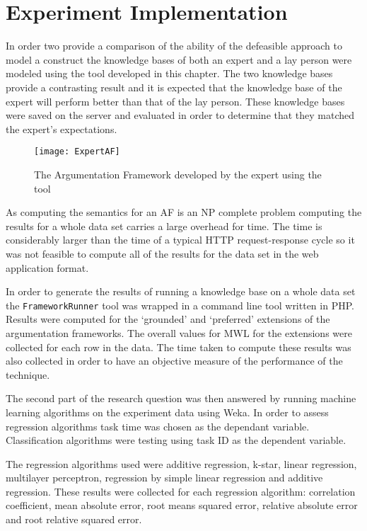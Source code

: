 
\section{Experiment Implementation}

In order two provide a comparison of the ability of the defeasible approach to model a construct the knowledge bases of both an expert and a lay person were modeled using the tool developed in this chapter. The two knowledge bases provide a contrasting result and it is expected that the knowledge base of the expert will perform better than that of the lay person. These knowledge bases were saved on the server and evaluated in order to determine that they matched the expert's expectations.

\begin{figure}[H]
\centering
\texttt{[image: ExpertAF]}
\caption{The Argumentation Framework developed by the expert using the tool}
\end{figure}


As computing the semantics for an AF is an NP complete problem computing the results for a whole data set carries a large overhead for time. The time is considerably larger than the time of a typical HTTP request-response cycle so it was not feasible to compute all of the results for the data set in the web application format. 

In order to generate the results of running a knowledge base on a whole data set the \lstinline{FrameworkRunner} tool was wrapped in a command line tool written in PHP. Results were computed for the `grounded' and `preferred' extensions of the argumentation frameworks. The overall values for MWL for the extensions were collected for each row in the data. The time taken to compute these results was also collected in order to have an objective measure of the performance of the technique.

The second part of the research question was then answered by running machine learning algorithms on the experiment data using Weka. In order to assess regression algorithms task time was chosen as the dependant variable. Classification algorithms were testing using task ID as the dependent variable.

The regression algorithms used were additive regression, k-star, linear regression, multilayer perceptron, regression by simple linear regression and additive regression. These results were collected for each regression algorithm: correlation coefficient, mean absolute error, root means squared error, relative absolute error and root relative squared error.

